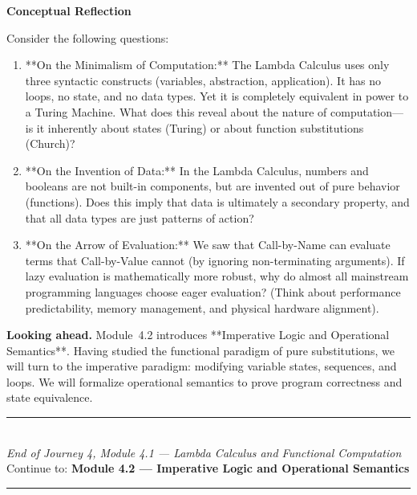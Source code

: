\documentclass[12pt, a4paper]{book}
\begin{document}
\begin{reflectionbox}
\textbf{Conceptual Reflection}

Consider the following questions:
\begin{enumerate}
  \item **On the Minimalism of Computation:** The Lambda Calculus uses only three syntactic constructs (variables, abstraction, application). It has no loops, no state, and no data types. Yet it is completely equivalent in power to a Turing Machine. What does this reveal about the nature of computation—is it inherently about states (Turing) or about function substitutions (Church)?
  \item **On the Invention of Data:** In the Lambda Calculus, numbers and booleans are not built-in components, but are invented out of pure behavior (functions). Does this imply that data is ultimately a secondary property, and that all data types are just patterns of action?
  \item **On the Arrow of Evaluation:** We saw that Call-by-Name can evaluate terms that Call-by-Value cannot (by ignoring non-terminating arguments). If lazy evaluation is mathematically more robust, why do almost all mainstream programming languages choose eager evaluation? (Think about performance predictability, memory management, and physical hardware alignment).
\end{enumerate}
\end{reflectionbox}

\medskip
\noindent\textbf{Looking ahead.}
Module~4.2 introduces **Imperative Logic and Operational Semantics**. Having studied the functional paradigm of pure substitutions, we will turn to the imperative paradigm: modifying variable states, sequences, and loops. We will formalize operational semantics to prove program correctness and state equivalence.

\vspace{1.4cm}
\begin{center}
{\color{JourneyColor}\rule{0.5\linewidth}{0.8pt}}\\[6pt]
{\small\color{JourneyColor}\textit{End of Journey 4, Module 4.1 --- Lambda Calculus and Functional Computation}}\\[4pt]
{\small\color{JourneyColor}Continue to: \textbf{Module 4.2 --- Imperative Logic and Operational Semantics}}\\[6pt]
{\color{JourneyColor}\rule{0.5\linewidth}{0.8pt}}
\end{center}
\end{document}
